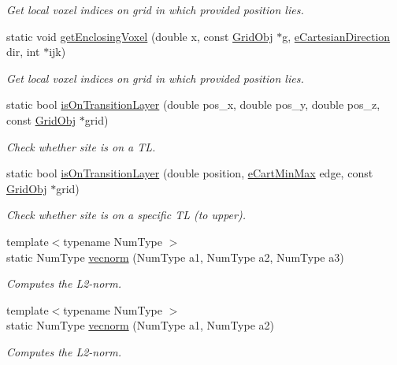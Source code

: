 \begin{DoxyCompactItemize}
\begin{DoxyCompactList}\small\item\em Get local voxel indices on grid in which provided position lies. \end{DoxyCompactList}\item 
static void \hyperlink{class_grid_utils_a20901145122cf56507713abe0467638c}{get\+Enclosing\+Voxel} (double x, const \hyperlink{class_grid_obj}{Grid\+Obj} $\ast$g, \hyperlink{_grid_utils_8h_afbad8e4a2f1e9903755b1bd2fe8273cf}{e\+Cartesian\+Direction} dir, int $\ast$ijk)
\begin{DoxyCompactList}\small\item\em Get local voxel indices on grid in which provided position lies. \end{DoxyCompactList}\item 
static bool \hyperlink{class_grid_utils_a78d9c31d1c15198d1455627d1fa29804}{is\+On\+Transition\+Layer} (double pos\+\_\+x, double pos\+\_\+y, double pos\+\_\+z, const \hyperlink{class_grid_obj}{Grid\+Obj} $\ast$grid)
\begin{DoxyCompactList}\small\item\em Check whether site is on a TL. \end{DoxyCompactList}\item 
static bool \hyperlink{class_grid_utils_ae99e3fa97dcb3be1f6b88a55f232c2cd}{is\+On\+Transition\+Layer} (double position, \hyperlink{_grid_utils_8h_a0cc91691e907a6a03b129d18a62fe33d}{e\+Cart\+Min\+Max} edge, const \hyperlink{class_grid_obj}{Grid\+Obj} $\ast$grid)
\begin{DoxyCompactList}\small\item\em Check whether site is on a specific TL (to upper). \end{DoxyCompactList}\item 
{\footnotesize template$<$typename Num\+Type $>$ }\\static Num\+Type \hyperlink{class_grid_utils_a78aa4876d7066bce253c52457e7b901d}{vecnorm} (Num\+Type a1, Num\+Type a2, Num\+Type a3)
\begin{DoxyCompactList}\small\item\em Computes the L2-\/norm. \end{DoxyCompactList}\item 
{\footnotesize template$<$typename Num\+Type $>$ }\\static Num\+Type \hyperlink{class_grid_utils_a7a169fc043a585f20936b314def45fe7}{vecnorm} (Num\+Type a1, Num\+Type a2)
\begin{DoxyCompactList}\small\item\em Computes the L2-\/norm. \end{DoxyCompactList}\item 

\end{DoxyCompactItemize}
